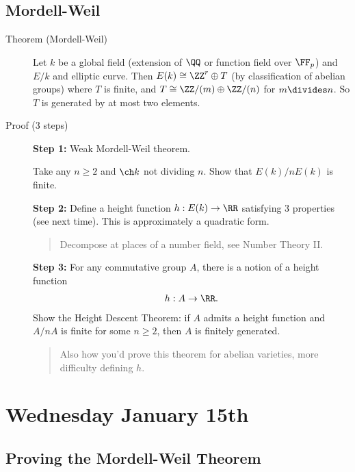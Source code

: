 \hypertarget{mordell-weil}{%
\subsection{Mordell-Weil}\label{mordell-weil}}

\begin{description}
\item[Theorem (Mordell-Weil)]
Let \(k\) be a global field (extension of \(\QQ\) or function field over
\(\FF_p\)) and \(E/k\) and elliptic curve. Then
\(E(k) \cong \ZZ^r \oplus T\) (by classification of abelian groups)
where \(T\) is finite, and \(T \cong \ZZ/(m) \oplus \ZZ/(n)\) for
\(m\divides n\). So \(T\) is generated by at most two elements.
\item[Proof (3 steps)]
\textbf{Step 1:} Weak Mordell-Weil theorem.

Take any \(n\geq 2\) and \(\ch k\) not dividing \(n\). Show that
\(E(k)/n E(k)\) is finite.

\textbf{Step 2:} Define a height function \(h: E(k) \to \RR\) satisfying
3 properties (see next time). This is approximately a quadratic form.

\begin{quote}
Decompose at places of a number field, see Number Theory II.
\end{quote}

\textbf{Step 3:} For any commutative group \(A\), there is a notion of a
height function
\begin{align*}h: A \to \RR.\end{align*} Show the Height Descent Theorem:
if \(A\) admits a height function and \(A/nA\) is finite for some
\(n\geq 2\), then \(A\) is finitely generated.

\begin{quote}
Also how you'd prove this theorem for abelian varieties, more difficulty
defining \(h\).
\end{quote}
\end{description}

\hypertarget{wednesday-january-15th}{%
\section{Wednesday January 15th}\label{wednesday-january-15th}}

\hypertarget{proving-the-mordell-weil-theorem}{%
\subsection{Proving the Mordell-Weil
Theorem}\label{proving-the-mordell-weil-theorem}}


